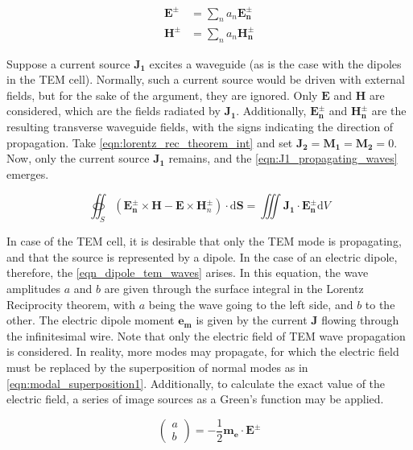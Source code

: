 \begin{align}
    \mathbf{E^\pm}&=\sum_na_n\mathbf{E_n^\pm}    \label{eqn:modal_superposition1}\\
    \mathbf{H^\pm}&=\sum_na_n\mathbf{H_n^\pm}    \label{eqn:modal_superposition2}
\end{align}

Suppose a current source $\mathbf{J_1}$ excites a waveguide (as is the case with the dipoles in the TEM cell). Normally, such a current source would be driven with external fields, but for the sake of the argument, they are ignored. Only $\mathbf{E}$ and $\mathbf{H}$ are considered, which are the fields radiated by $\mathbf{J_1}$. Additionally, $\mathbf{E_n^\pm}$ and $\mathbf{H_n^\pm}$ are the resulting transverse waveguide fields, with the signs indicating the direction of propagation. Take \autoref{eqn:lorentz_rec_theorem_int} and set $\mathbf{J_2}=\mathbf{M_1}=\mathbf{M_2}=0$. Now, only the current source $\mathbf{J_1}$ remains, and the \autoref{eqn:J1_propagating_waves} emerges. %

\begin{equation}
    \oiint _S (\mathbf{E_n^\pm}\times \mathbf{H}-\mathbf{E}\times \mathbf{H}_n^\pm)\cdot\mathrm{d}\mathbf{S}=\iiint \mathbf{J_1}\cdot\mathbf{E_n^\pm}\mathrm{d}V
    \label{eqn:J1_propagating_waves}
\end{equation}

In case of the TEM cell, it is desirable that only the TEM mode is propagating, and that the source is represented by a dipole. In the case of an electric dipole, therefore, the \autoref{eqn_dipole_tem_waves} arises. In this equation, the wave amplitudes $a$ and $b$ are given through the surface integral in the Lorentz Reciprocity theorem, with $a$ being the wave going to the left side, and $b$ to the other. The electric dipole moment $\mathbf{e_m}$ is given by the current $\mathbf{J}$ flowing through the infinitesimal wire. Note that only the electric field of TEM wave propagation is considered. In reality, more modes may propagate, for which the electric field must be replaced by the superposition of normal modes as in \autoref{eqn:modal_superposition1}. Additionally, to calculate the exact value of the electric field, a series of image sources as a Green's function may be applied.

\begin{equation}
\begin{pmatrix}a \\b\end{pmatrix} = -\frac{1}{2}\mathbf{m_e}\cdot \mathbf{E}^\pm
\label{eqn_dipole_tem_waves}
\end{equation}


